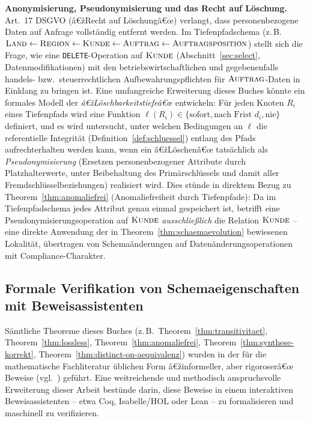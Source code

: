﻿\documentclass[a4paper,12pt]{report}
\theoremstyle{definition}
\theoremstyle{remark}
\begin{document}
\textbf{Anonymisierung, Pseudonymisierung und das Recht auf
Löschung.} Art.~17 DSGVO (â€žRecht auf Löschungâ€œ) verlangt, dass
personenbezogene Daten auf Anfrage vollständig entfernt werden. Im
Tiefenpfadschema (z.\,B.\ $\textsc{Land}\leftarrow\textsc{Region}
\leftarrow\textsc{Kunde}\leftarrow\textsc{Auftrag}\leftarrow
\textsc{Auftragsposition}$) stellt sich die Frage, wie eine
\texttt{DELETE}-Operation auf $\textsc{Kunde}$
(Abschnitt~\ref{sec:select}, Datenmodifikationen) mit den
betriebswirtschaftlichen und gegebenenfalls handels- bzw.\
steuerrechtlichen Aufbewahrungspflichten für
$\textsc{Auftrag}$-Daten in Einklang zu bringen ist. Eine umfangreiche
Erweiterung dieses Buches könnte ein formales Modell der
\emph{â€žLöschbarkeitstiefeâ€œ} entwickeln: Für jeden Knoten $R_i$ eines
Tiefenpfads wird eine Funktion $\ell(R_i)\in\{\text{sofort},
\text{nach Frist }d_i,\text{nie}\}$ definiert, und es wird untersucht,
unter welchen Bedingungen an $\ell$ die referentielle Integrität
(Definition~\ref{def:schluessel}) entlang des Pfads aufrechterhalten
werden kann, wenn ein â€žLöschenâ€œ tatsächlich als
\emph{Pseudonymisierung} (Ersetzen personenbezogener Attribute durch
Platzhalterwerte, unter Beibehaltung des Primärschlüssels und damit
aller Fremdschlüsselbeziehungen) realisiert wird. Dies stünde in
direktem Bezug zu Theorem~\ref{thm:anomaliefrei}
(Anomaliefreiheit durch Tiefenpfade): Da im Tiefenpfadschema jedes
Attribut genau einmal gespeichert ist, betrifft eine
Pseudonymisierungsoperation auf $\textsc{Kunde}$ \emph{ausschließlich}
die Relation $\textsc{Kunde}$ -- eine direkte Anwendung der in
Theorem~\ref{thm:schaemaevolution} bewiesenen Lokalität, übertragen
von Schemaänderungen auf Datenänderungsoperationen mit
Compliance-Charakter.

\subsection{Formale Verifikation von Schemaeigenschaften mit Beweisassistenten}
\label{sec:ausblick-verifikation}

Sämtliche Theoreme dieses Buches (z.\,B.\
Theorem~\ref{thm:transitivitaet},
Theorem~\ref{thm:lossless},
Theorem~\ref{thm:anomaliefrei},
Theorem~\ref{thm:synthese-korrekt},
Theorem~\ref{thm:distinct-on-aequivalenz}) wurden in der für die
mathematische Fachliteratur üblichen Form â€žinformeller, aber
rigoroserâ€œ Beweise (vgl.\ \cite{Cormen2009}) geführt. Eine
weitreichende und methodisch anspruchsvolle Erweiterung dieser Arbeit
bestünde darin, diese Beweise in einem interaktiven
Beweisassistenten -- etwa Coq, Isabelle/HOL oder Lean -- zu
formalisieren und maschinell zu verifizieren.
\end{document}
